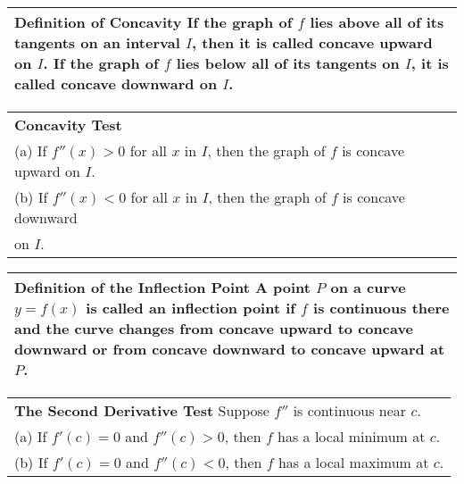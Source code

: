 \documentclass{article}
\begin{document}
\begin{center}
\large
\def\arraystretch{1.3}
{\setlength{\tabcolsep}{16pt}
\begin{tabularx}{.9\textwidth}{|X|}
\hline
	\textbf{Definition of Concavity} \: If the graph of $f$ lies above all of its tangents on an interval $I$, then it is called \textbf{concave upward} on $I$. If the graph of $f$ lies below all of its tangents on $I$, it is called \textbf{concave downward} on $I$. \\
\hline
\end{tabularx}}
\vspace{16pt}

\large
\def\arraystretch{1.3}
{\setlength{\tabcolsep}{16pt}
\begin{tabularx}{.9\textwidth}{|X|}
\hline
	\textbf{Concavity Test} \\
	(a) If $f''(x) > 0$ for all $x$ in $I$, then the graph of $f$ is concave upward on $I$. \\
	(b) If $f''(x) < 0$ for all $x$ in $I$, then the graph of $f$ is concave downward \\ \hspace{16pt} on $I$. \\
\hline
\end{tabularx}}
\vspace{16pt}

\large
\def\arraystretch{1.3}
{\setlength{\tabcolsep}{16pt}
\begin{tabularx}{.9\textwidth}{|X|}
\hline
	\textbf{Definition of the Inflection Point} \: A point $P$ on a curve $y=f(x)$ is called an \textbf{inflection point} if $f$ is continuous there and the curve changes from concave upward to concave downward or from concave downward to concave upward at $P$. \\
\hline
\end{tabularx}}
\vspace{16pt}

\large
\def\arraystretch{1.3}
{\setlength{\tabcolsep}{16pt}
\begin{tabularx}{.9\textwidth}{|X|}
\hline
	\textbf{The Second Derivative Test} \: Suppose $f''$ is continuous near $c$. \\
	(a) If $f'(c) = 0$ and $f''(c) > 0$, then $f$ has a local minimum at $c$. \\
	(b) If $f'(c) = 0$ and $f''(c) < 0$, then $f$ has a local maximum at $c$. \\
\hline
\end{tabularx}}
\vspace{16pt}
\end{center}
\pagebreak
\end{document}
